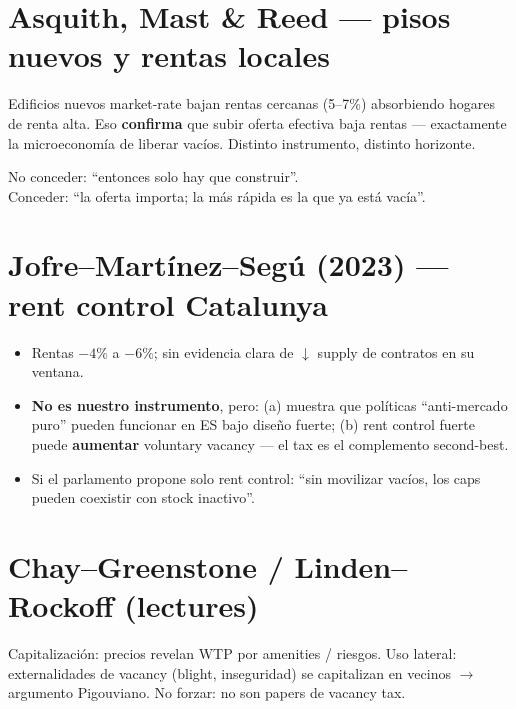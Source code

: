 \documentclass[11pt,a4paper]{report}
\begin{document}
\section{Asquith, Mast \& Reed --- pisos nuevos y rentas locales}

\begin{intuicion}
Edificios nuevos market-rate bajan rentas cercanas (5--7\%) absorbiendo hogares
de renta alta. Eso \textbf{confirma} que subir oferta efectiva baja rentas ---
exactamente la microeconom\'ia de liberar vac\'ios. Distinto instrumento, distinto horizonte.
\end{intuicion}

\begin{frase}
No conceder: ``entonces solo hay que construir''.\\
Conceder: ``la oferta importa; la m\'as r\'apida es la que ya est\'a vac\'ia''.
\end{frase}

\section{Jofre--Mart\'inez--Seg\'u (2023) --- rent control Catalunya}

\begin{itemize}
  \item Rentas $-4\%$ a $-6\%$; sin evidencia clara de $\downarrow$ supply de contratos en su ventana.
  \item \textbf{No es nuestro instrumento}, pero:
        (a) muestra que pol\'iticas ``anti-mercado puro'' pueden funcionar en ES bajo dise\~no fuerte;
        (b) rent control fuerte puede \textbf{aumentar} voluntary vacancy --- el tax es el
        complemento second-best.
  \item Si el parlamento propone solo rent control: ``sin movilizar vac\'ios, los caps pueden
        coexistir con stock inactivo''.
\end{itemize}

\section{Chay--Greenstone / Linden--Rockoff (lectures)}

Capitalizaci\'on: precios revelan WTP por amenities / riesgos.
Uso lateral: externalidades de vacancy (blight, inseguridad) se capitalizan en vecinos
$\rightarrow$ argumento Pigouviano. No forzar: no son papers de vacancy tax.

\end{document}
